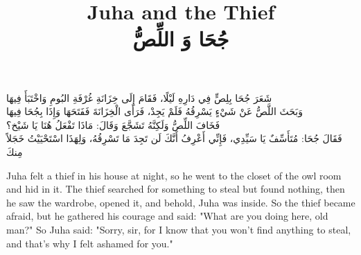 \documentclass[letterpaper,12pt]{article}
\begin{document}
\title{\textbf{\Large Juha and the Thief}\\
\textbf{\Large \textarabic{ جُحَا وَ اللِّصُّ}}}
\date{}
\maketitle

\begin{tcolorbox}[colback=boxcolor,colframe=headercolor,title=\textbf{Full text in Arabic},breakable]
\centering
\Large{\color{blue!50!black}\textarabic{شَعَرَ جُحَا بِلِصٍّ فِي دَارِهِ لَيْلًا، فَقَامَ إِلَى خِزَانَةِ غُرْفَةِ البُومِ وَاخْتَبَأَ فِيهَا}}\\
{\color{green!30!black}\textarabic{وَبَحَثَ اللَّصُّ عَنْ شَيْءٍ يَسْرِقُهُ فَلَمْ يَجِدْ، فَرَأَى الْخِزَانَةَ فَفَتَحَهَا وَإِذَا بِجُحَا فِيهَا}}\\
{\color{blue!50!black}\textarabic{فَخَافَ اللِّصُّ وَلَكِنَّهُ تَشَجَّعَ وَقَالَ: مَاذَا تَفْعَلُ هُنَا يَا شَيْخ؟}}\\
{\color{green!30!black}\textarabic{فَقَالَ جُحَا: مُتَأَسِّفٌ يَا سَيِّدِي، فَإِنِّي أَعْرِفُ أَنَّكَ لَن تَجِدَ مَا تَسْرِقُهُ، وَلِهَذَا اسْتَحْيَيْتُ خَجَلاً مِنكَ}}\\
\end{tcolorbox}

\begin{tcolorbox}[colback=white,colframe=accentcolor,breakable,title=\textbf{English Translation}]
Juha felt a thief in his house at night, so he went to the closet of the owl room and hid in it.
The thief searched for something to steal but found nothing, then he saw the wardrobe, opened it, and behold, Juha was inside.
So the thief became afraid, but he gathered his courage and said: "What are you doing here, old man?"
So Juha said: "Sorry, sir, for I know that you won't find anything to steal, and that's why I felt ashamed for you."
\end{tcolorbox}
\end{document}
